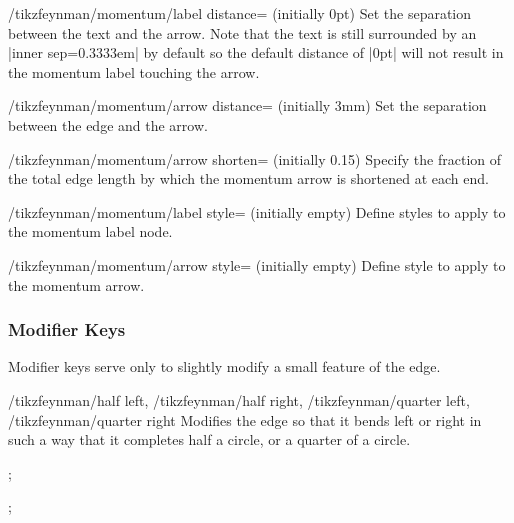 \documentclass[a4paper,final]{ltxdoc}
\begin{document}
\begin{keylist}
\begin{key}{/tikzfeynman/momentum/label distance= (initially 0pt)}
  Set the separation between the text and the arrow.  Note that the text is still surrounded by an |inner sep=0.3333em| by default so the default distance of |0pt| will not result in the momentum label touching the arrow.
\end{key}

\begin{key}{/tikzfeynman/momentum/arrow distance= (initially 3mm)}
  Set the separation between the edge and the arrow.
\end{key}

\begin{key}{/tikzfeynman/momentum/arrow shorten= (initially 0.15)}
  Specify the fraction of the total edge length by which the momentum arrow is shortened at each end.
\end{key}

\begin{key}{/tikzfeynman/momentum/label style= (initially \normalfont empty)}
  Define styles to apply to the momentum label node.
\end{key}

\begin{key}{/tikzfeynman/momentum/arrow style= (initially \normalfont empty)}
  Define style to apply to the momentum arrow.
\end{key}
\end{keylist}

\subsubsection{Modifier Keys}
\label{subsubsec:modifier_keys}

Modifier keys serve only to slightly modify a small feature of the edge.

\begin{keylist}{%
    /tikzfeynman/half left,
    /tikzfeynman/half right,
    /tikzfeynman/quarter left,
    /tikzfeynman/quarter right}
  Modifies the edge so that it bends left or right in such a way that it completes half a circle, or a quarter of a circle.

\begin{codeexample}[]
;
\end{codeexample}

\begin{codeexample}[]
;
\end{codeexample}
\end{keylist}
\end{document}
